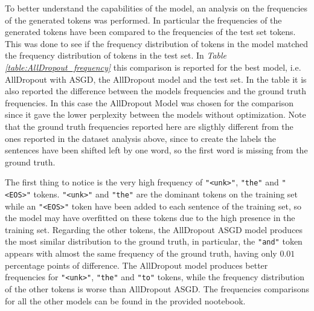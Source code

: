 \documentclass[a4paper]{article}
\begin{document}
To better understand the capabilities of the model, an analysis on the frequencies of the generated tokens was performed.
In particular the frequencies of the generated tokens have been compared to the frequencies of the test set tokens. This was
done to see if the frequency distribution of tokens in the model matched the frequency distribution of tokens in the test set. 
In \textit{Table \ref{table:AllDropout_frequency}} this comparison is reported for the best model, i.e. AllDropout with ASGD, the AllDropout model and the test set.
In the table it is also reported the difference between the models frequencies and the ground truth frequencies. In this case the AllDropout Model was chosen for the comparison 
since it gave the lower perplexity between the models without optimization.
Note that the ground truth frequencies reported here are sligthly different from the ones reported in the dataset analysis above,
since to create the labels the sentences have been shifted left by one word, so the first word is missing from the ground truth.

The first thing to notice is the very high frequency of \lstinline{"<unk>"}, \lstinline{"the"} and \lstinline{"<EOS>"} tokens.
\lstinline{"<unk>"} and \lstinline{"the"} are the dominant tokens on the training set while an \lstinline{"<EOS>"} token have been added
to each sentence of the training set, so the model may have overfitted on these tokens due to the high presence in the training set. Regarding the other tokens, the AllDropout ASGD model 
produces the most similar distribution to the ground truth, in particular, the \lstinline{"and"} token appears with almost the same frequency of the 
ground truth, having only $0.01$ percentage points of difference. The AllDropout model produces better frequencies for \lstinline{"<unk>"}, 
\lstinline{"the"} and \lstinline{"to"} tokens, while the frequency distribution of the other tokens is worse than AllDropout ASGD.
The frequencies comparisons for all the other models can be found in the provided nootebook.
\end{document}
